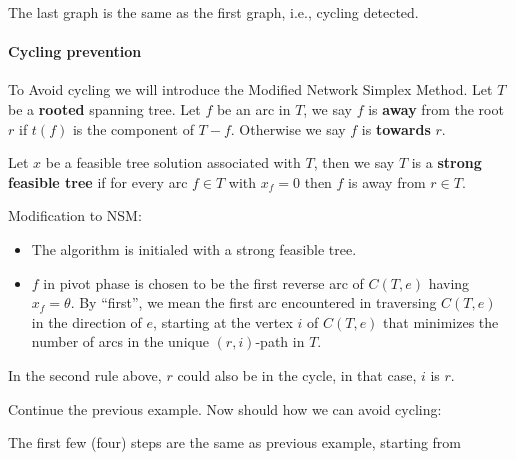                     The last graph is the same as the first graph, i.e., cycling detected.

                \paragraph{Cycling prevention}
                    To Avoid cycling we will introduce the Modified Network Simplex Method. Let $T$ be a \textbf{rooted} spanning tree. Let $f$ be an arc in $T$, we say $f$ is \textbf{away} from the root $r$ if $t(f)$ is the component of $T-f$. Otherwise we say $f$ is \textbf{towards} $r$.

                    Let $x$ be a feasible tree solution associated with $T$, then we say $T$ is a \textbf{strong feasible tree} if for every arc $f \in T$ with $x_f = 0$ then $f$ is away from $r\in T$.

                    Modification to NSM:
                    \begin{itemize}
                        \item The algorithm is initialed with a strong feasible tree.
                        \item $f$ in pivot phase is chosen to be the first reverse arc of $C(T, e)$ having $x_f = \theta$. By ``first'', we mean the first arc encountered in traversing $C(T, e)$ in the direction of $e$, starting at the vertex $i$ of $C(T, e)$ that minimizes the number of arcs in the unique $(r, i)$-path in $T$.
                    \end{itemize}

                    In the second rule above, $r$ could also be in the cycle, in that case, $i$ is $r$.

                    Continue the previous example. Now should how we can avoid cycling:

                    The first few (four) steps are the same as previous example, starting from

                    \begin{figure}[H]
                        \centering
                    \end{figure}

